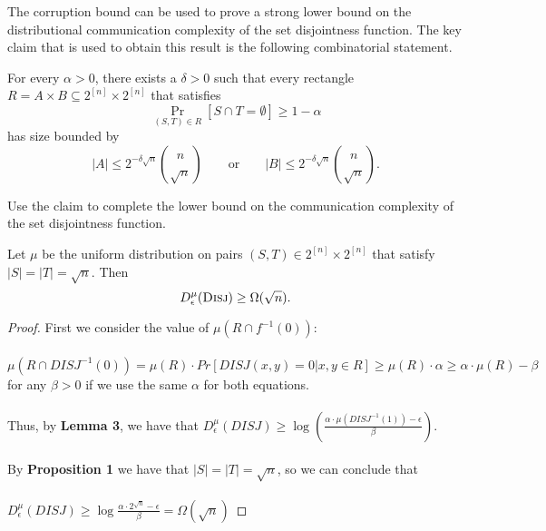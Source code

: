 The corruption bound can be used to prove a strong lower bound on the distributional communication complexity of the set disjointness function. The key claim that is used to obtain this result is the following combinatorial statement.

\begin{proposition}
	For every $\alpha>0$, there exists a $\delta>0$ such that every rectangle $R = A \times B \subseteq 2^{[n]} \times 2^{[n]}$
	that satisfies 
	\[
	\Pr_{(S,T) \in R}[ S \cap T = \emptyset ] \ge 1-\alpha
	\]
	has size bounded by
	\[
	|A| \le 2^{-\delta \sqrt{n}} \binom{n}{\sqrt{n}}
	\qquad \mbox{or} \qquad
	|B| \le 2^{-\delta \sqrt{n}} \binom{n}{\sqrt{n}}.
	\]
\end{proposition}

Use the claim to complete the lower bound on the communication complexity of the set disjointness function.

\begin{theorem}
	Let $\mu$ be the uniform distribution on pairs $(S,T) \in 2^{[n]} \times 2^{[n]}$ that satisfy $|S| = |T| = \sqrt{n}$. Then
	\[
	D_\epsilon^{\mu}(\textsc{Disj}) \ge \Omega(\sqrt{n}).
	\]
\end{theorem}

\begin{proof}
	First we consider the value of $\mu(R \cap f^{-1}(0))$:\\
	\\
	$\mu(R \cap DISJ^{-1}(0)) = \mu(R) \cdot Pr[DISJ(x,y) = 0|x,y \in R] \ge \mu(R) \cdot \alpha \ge \alpha \cdot \mu(R) - \beta$ for any $\beta > 0$ if we use the same $\alpha$ for both equations.\\
	\\
	Thus, by \textbf{Lemma 3}, we have that $D^\mu_\epsilon(DISJ) \ge \log\left( \frac{\alpha \cdot \mu(DISJ^{-1}(1)) - \epsilon}{\beta}\right)$.\\ 
	\\
	By \textbf{Proposition 1} we have that $|S| = |T| = \sqrt{n}$, so we can conclude that \\
	\\
	$D^\mu_\epsilon(DISJ) \ge \log \frac{\alpha \cdot 2^{\sqrt{n}} - \epsilon}{\beta} = \Omega(\sqrt{n})$
\end{proof}